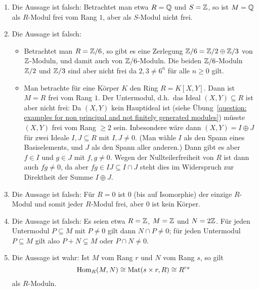 \begin{solution}
\begin{enumerate}
    \item
      Die Aussage ist falsch:
      Betrachtet man etwa $R = \mathbb{Q}$ und $S = \mathbb{Z}$, so ist $M = \mathbb{Q}$ als $R$-Modul frei vom Rang $1$, aber als $S$-Modul nicht frei.
      
    \item
      Die Aussage ist falsch:
      \begin{itemize}
        \item
          Betrachtet man $R = \mathbb{Z}/6$, so gibt es eine Zerlegung $\mathbb{Z}/6 = \mathbb{Z}/2 \oplus \mathbb{Z}/3$ von $\mathbb{Z}$-Moduln, und damit auch von $\mathbb{Z}/6$-Moduln.
          Die beiden $\mathbb{Z}/6$-Moduln $\mathbb{Z}/2$ und $\mathbb{Z}/3$ sind aber nicht frei da $2, 3 \neq 6^n$ für alle $n \geq 0$ gilt.
        \item
          Man betrachte für eine Körper $K$ den Ring $R = K[X,Y]$.
          Dann ist $M = R$ frei vom Rang $1$.
          Der Untermodul, d.h.\ das Ideal $(X,Y) \subseteq R$ ist aber nicht frei:
          Da $(X,Y)$ kein Hauptideal ist (siehe Übung~\ref{question: examples for non principal and not finitely generated modules}) müsste $(X,Y)$ frei vom Rang $\geq 2$ sein.
          Inbesondere wäre dann $(X,Y) = I \oplus J$ für zwei Ideale $I, J \subseteq R$ mit $I, J \neq 0$.
          (Man wähle $I$ als den Spann eines Basiselements, und $J$ als den Spann aller anderen.)
          Dann gibt es aber $f \in I$ und $g \in J$ mit $f, g \neq 0$.
          Wegen der Nullteilerfreiheit von $R$ ist dann auch $fg \neq 0$, da aber $fg \in IJ \subseteq I \cap J$ steht dies im Widerspruch zur Direktheit der Summe $I \oplus J$.
      \end{itemize}
      
    \item
      Die Aussage ist falsch:
      Für $R = 0$ ist $0$ (bis auf Isomorphie) der einzige $R$-Modul und somit jeder $R$-Modul frei, aber $0$ ist kein Körper.
      
    \item
      Die Aussage ist falsch:
      Es seien etwa $R = \mathbb{Z}$, $M = \mathbb{Z}$ und $N = 2\mathbb{Z}$.
      Für jeden Untermodul $P \subseteq M$ mit $P \neq 0$ gilt dann $N \cap P \neq 0$;
      für jeden Untermodul $P \subseteq M$ gilt also $P + N \subsetneq M$ oder $P \cap N \neq 0$.
      
    \item
      Die Aussage ist wahr:
      Ist $M$ vom Rang $r$ und $N$ vom Rang $s$, so gilt
      \[
              \operatorname{Hom}_R(M,N)
        \cong \operatorname{Mat}(s \times r, R)
        \cong R^{rs}
      \]
      als $R$-Moduln.
      

\end{enumerate}
\end{solution}
